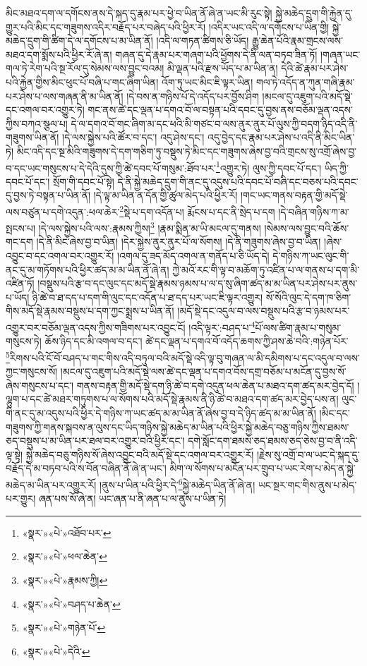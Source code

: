མིང་མཐའ་དག་ལ་དགོངས་ནས་དེ་སྐད་དུ་རྣམ་པར་ཕྱེ་བ་ཡིན་ནོ་ཞེ་ན་ཡང་མི་རུང་སྟེ། སྐྱེ་མཆེད་དྲུག་གི་རྐྱེན་དུ་གྱུར་པའི་མིང་དང་གཟུགས་འདིར་བརྗོད་པར་བཞེད་པའི་ཕྱིར་རོ། །འདིར་ཡང་འདི་ལ་དགོངས་པ་ཡིན་གྱི། སྐྱེ་མཆེད་དྲུག་གི་ཚིག་དེ་ལ་དགོངས་པ་མ་ཡིན་ནོ། །འདི་ལ་གཏན་ཚིགས་ཅི་ཡོད། རྒྱུ་ཆེན་པོའི་རྣམ་གྲངས་ལས་མཐའ་དག་སྨོས་པའི་ཕྱིར་རོ་ཞེ་ན། གཞན་དུ་དེ་རྣམ་པར་གཞག་པའི་ཕྱོགས་དེ་ནི་ལན་བཏབ་ཟིན་ཏོ། །གཞན་ཡང་གལ་ཏེ་རེག་པའི་སྔ་རོལ་དུ་སེམས་ལས་བྱུང་བའམ། མི་ལྡན་པའི་རྫས་ཡོད་པ་མ་ཡིན་ན། དེའི་ཚེ་རྣམ་པར་ཤེས་པའི་རྐྱེན་གྱིས་མིང་ཕུང་པོ་བཞི་པ་གང་ཞིག་ཡིན། འོག་ཏུ་ཡང་མིང་ཇི་ལྟར་ཡིན། གལ་ཏེ་འདོད་ན་ཀུན་གཞི་རྣམ་པར་ཤེས་པ་ལས་གཞན་ནི་མ་ཡིན་ནོ། །དེ་བས་ན་གཉིས་པོ་དེ་འདོད་པར་བྱོས་ཤིག །མངལ་དུ་འཇུག་པའི་མདོ་སྡེ་དང་འགལ་བར་འགྱུར་ཏེ། གང་ནས་ཚེ་དང་ལྡན་པ་དགའ་བོ་ལ་བསྟན་པའི་དབང་དུ་བྱས་ནས་བཅོམ་ལྡན་འདས་ཀྱིས་བཀའ་སྩལ་པ། དེ་ལ་དགའ་བོ་གང་ཞིག་མ་དང་ཕའི་མི་གཙང་བ་ལས་ནུར་ནུར་པོ་ལུས་ཀྱི་བདག་ཉིད་འདི་ནི་གཟུགས་ཡིན་ནོ། །དེ་ལས་སྐྱེས་པའི་ཚོར་བ་དང་། འདུ་ཤེས་དང་། འདུ་བྱེད་དང་རྣམ་པར་ཤེས་པ་འདི་ནི་མིང་ཡིན་ཏེ། མིང་འདི་དང་སྔ་མིའི་གཟུགས་དེ་དག་གཅིག་ཏུ་བསྡུས་ཏེ་མིང་དང་གཟུགས་ཞེས་བྱ་བའི་གྲངས་སུ་འགྲོ་ཞེས་བྱ་བ་དང་ཡང་གསུངས་པ་དེ་དེའི་དུས་ཀྱི་ཚེ་དབང་པོ་གསུམ་:ཐོབ་པར་\footnote{«སྣར་»«པེ་»འཐོབ་པར་}འགྱུར་ཏེ། ལུས་ཀྱི་དབང་པོ་དང་། ཡིད་ཀྱི་དབང་པོ་དང་། སྲོག་གི་དབང་པོ་སྟེ། དེ་ནི་སྐྱེ་མཆེད་དྲུག་གི་ནང་དུ་འདུས་པའི་དབང་པོ་བཞི་དང་བཅས་པའི་དབང་དུ་བྱས་ཏེ་བསྟན་པ་ཡིན་ནོ། །དེ་ལྟ་མ་ཡིན་ན་དོན་གྱི་ཚུལ་མེད་པའི་ཕྱིར་རོ། །གང་ཡང་གནས་བརྟན་གྱི་མདོ་སྡེ་ལས་བཙུན་པ་དགེ་འདུན་:ཕལ་ཆེར་\footnote{«སྣར་»«པེ་»ཕལ་ཆེན་}སྡེ་པ་དག་འདོན་པ། རྨོངས་པ་དང་ནི་སྲེད་པ་དག །དེ་བཞིན་གཉིས་ཀ་མ་སྤངས་པ། །དེ་ལས་སྐྱེས་པའི་ལས་:རྣམས་ཀྱིས།\footnote{«སྣར་»«པེ་»རྣམས་ཀྱི།} །རྣམ་སྨིན་མ་ཡི་མངལ་དུ་གནས། །སེམས་ལས་བྱུང་བའི་ཆོས་གང་དག །དེ་ནི་མིང་ཞེས་བྱ་བ་ཡིན། །དེར་སྐྱེས་ནུར་ནུར་པོ་ལ་སོགས། །དེ་ནི་གཟུགས་ཞེས་བྱ་བ་ཡིན། །ཞེས་འབྱུང་བ་དང་འགལ་བར་འགྱུར་རོ། །འགལ་དུ་ཟད་མོད་འགལ་ན་གནོད་པ་ཅི་ཡོད་དེ། དེ་གཉིས་ཀ་ཡང་ལུང་གི་ནང་དུ་མ་གཏོགས་པའི་ཕྱིར་ཚད་མ་མ་ཡིན་ནོ་ཞེ་ན། ཀྱེ་མའོ་རང་གི་ལྟ་བ་མཆོག་ཏུ་འཛིན་པ་ལ་གནས་པ་དག་མི་འཛིན་ཏོ། །བསྡུས་པའི་རྩ་བ་དང་ལུང་དང་མདོ་སྡེ་རྣམས་ཉམས་པ་ལ་ད་སུ་ཞིག་ཚད་མ་མ་ཡིན་པར་ཤེས་པར་ནུས་པ་ཡོད། ཉི་ཚེ་བ་ཐ་དད་པ་དག་གི་ལུང་དང་འདོན་པ་ཐ་དད་པར་ཡང་ཇི་ལྟར་འགྱུར། སོ་སོའི་ལུང་དེ་དག་ཁ་ཅིག་གིས་མདོ་སྡེ་རྣམས་བསྡུས་པ་དག་ཀྱང་སྨྲས་པ་ཡིན་ནོ། །མདོ་སྡེ་དང་འདུལ་བ་ལས་བསྡུས་པའི་རྩ་བ་ཉམས་པར་འགྱུར་བར་བཅོམ་ལྡན་འདས་ཀྱིས་གཟིགས་པར་འབྱུང་ངོ། །འདི་ལྟར་:བཤད་པ་\footnote{«སྣར་»«པེ་»བཤད་པ་ཆེན་}པོ་ལས་ཚིག་རྣམ་པ་གསུམ་གསུངས་ཏེ། ཆོས་ཉིད་དང་མི་འགལ་བ་དང་། ཚེ་དང་ལྡན་པ་དགའ་བོ་འདོད་ཆགས་ཀྱི་ཤས་ཆེ་བའི་:གཉེན་པོར་\footnote{«སྣར་»«པེ་»གཉེན་པོ་}རིགས་པའི་ངོ་བོ་བཤད་པ་གང་གིས་འདི་བཏུལ་བའི་མདོ་སྡེ་འདི་ལྟ་བུ་གཞན་ལ་མི་དམིགས་པ་དང་འདུལ་བ་ལས་ཀྱང་གསུངས་སོ། །མངལ་དུ་འཇུག་པའི་མདོ་སྡེ་ལས་ཚེ་དང་ལྡན་པ་དགའ་བོས་དགྲ་བཅོམ་པ་མངོན་དུ་བྱས་སོ་ཞེས་གསུངས་པ་དང་། གནས་བརྟན་གྱི་མདོ་སྡེ་དག་ཉི་ཚེ་བ་དགེ་འདུན་ཕལ་ཆེན་པ་མཐའ་དག་ཚད་མར་བྱེད་དོ། །ལྷུག་པ་དང་ཚེ་མཐར་གཏུགས་པ་ལ་སོགས་པའི་མདོ་སྡེ་རྣམས་ནི་ཉི་ཚེ་བ་མཐའ་དག་ཚད་མར་བྱེད་པས་ན། ལུང་གི་ནང་དུ་མ་འདུས་པའི་ཕྱིར་དེ་གཉིས་ཀ་ཡང་ཚད་མ་མ་ཡིན་ནོ་ཞེས་བྱ་བ་དེ་ཉིད་ཚད་མ་མ་ཡིན་ནོ། །མིང་དང་གཟུགས་ཀྱི་གནས་སྐབས་ན་ལུས་དང་ཡིད་གཉིས་སྐྱེ་མཆེད་མ་ཡིན་པའི་ཕྱིར་སྐྱེ་མཆེད་བཅུ་གཉིས་ཀྱིས་ཐམས་ཅད་བསྡུས་པ་མ་ཡིན་པར་ཐལ་བར་འགྱུར་བའི་ཕྱིར་དང་། དགེ་སློང་དག་ཐམས་ཅད་ཐམས་ཅད་ཅེས་བྱ་བ་ནི་འདི་ལྟ་སྟེ། སྐྱེ་མཆེད་བཅུ་གཉིས་སོ་ཞེས་འབྱུང་བའི་མདོ་སྡེ་དང་འགལ་བར་འགྱུར་རོ། །རྗེས་སུ་འགྲོ་བ་ལ་ཡང་དེ་སྐད་དུ་བརྗོད་དེ་མ་བཏབ་པའི་ས་བོན་བཞིན་ནོ་ཞེ་ན་ཡང་། མིག་ལ་སོགས་པ་མངོན་པར་གྲུབ་པ་ཡང་རེག་པ་མེད་ན་སྐྱེ་མཆེད་མ་ཡིན་པར་འགྱུར་རོ། །ནུས་པ་ཡིན་པའི་ཕྱིར་དེ་\footnote{«སྣར་»«པེ་»དེའི་}སྐྱེ་མཆེད་ཡིན་ནོ་ཞེ་ན། ཡང་སྔར་གང་གིས་ནུས་པ་མེད་པར་གྱུར། ཞན་པས་སོ་ཞེ་ན། ཡང་ཞན་པ་ནི་ཞན་པ་ལ་ནུས་པ་ཡིན་ཏེ། 
